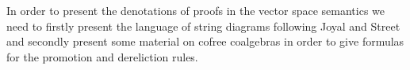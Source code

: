 \documentclass[english,letter paper,12pt,reqno]{article}
\theoremstyle{example}
\numberwithin{equation}{section}
\begin{document}
In order to present the denotations of proofs in the vector space semantics we need to firstly present the language of string diagrams following Joyal and Street \cite{JSGoTCI,JSGoTCII,ladia,khovdia,mellies, mellies_dia} and secondly present some material on cofree coalgebras in order to give formulas for the promotion and dereliction rules.


\end{document}
